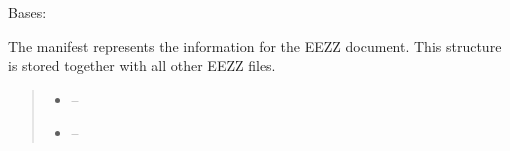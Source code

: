 \documentclass[letterpaper,10pt,english]{sphinxmanual}
\begin{document}
\begin{savenotes}\begin{fulllineitems}
\label{\detokenize{eezz:eezz.document.TManifest}}
\pysigstartsignatures
{}
\pysigstopsignatures
\sphinxAtStartPar
Bases: 

\sphinxAtStartPar
The manifest represents the information for the EEZZ document. This structure is stored
together with all other EEZZ files.
\begin{quote}\begin{description}
\begin{itemize}
\item {} 
\sphinxAtStartPar
{} – 

\item {} 
\sphinxAtStartPar
{} – 

\end{itemize}

\end{description}\end{quote}

\begin{savenotes}\begin{fulllineitems}
\label{\detokenize{eezz:eezz.document.TManifest.get_key}}
\pysigstartsignatures
{}
\pysigstopsignatures
\end{fulllineitems}\end{savenotes}


\begin{savenotes}\begin{fulllineitems}
\label{\detokenize{eezz:eezz.document.TManifest.get_values}}
\pysigstartsignatures
{}
\pysigstopsignatures
\end{fulllineitems}\end{savenotes}


\end{fulllineitems}
\end{savenotes}
\end{document}
